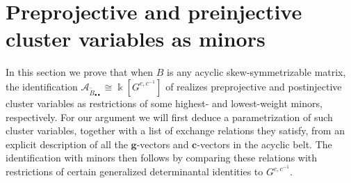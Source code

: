 \documentclass[12pt]{amsart}
\newcommand{\saySS}[1]{\say[SS]{\color{blue}{\bf SS:}\;#1}}
\newcommand{\cA}{\mathcal{A}}
\newcommand{\kk}{\Bbbk}%
\newcommand{\bfc}{\mathbf{c}}
\newcommand{\bfg}{\mathbf{g}}
\newtheorem{lemma}[theorem]{Lemma}
\theoremstyle{remark}
\numberwithin{equation}{section}
\begin{document}

\section{Preprojective and preinjective cluster variables as minors}
In this section we prove that when $B$ is any acyclic skew-symmetrizable matrix, the identification $\cA_{\widetilde B_{\bullet\bullet}} \cong \kk[G^{c,c^{-1}}]$ of  realizes preprojective and postinjective cluster variables as restrictions of some highest- and lowest-weight minors, respectively. 
For our argument we will first deduce a parametrization of such cluster variables, together with a list of exchange relations they satisfy, from an explicit description of all the $\bfg$-vectors and $\bfc$-vectors in the acyclic belt.
The identification with minors then follows by comparing these relations with restrictions of certain generalized determinantal identities to $G^{c,c^{-1}}$.
\end{document}
